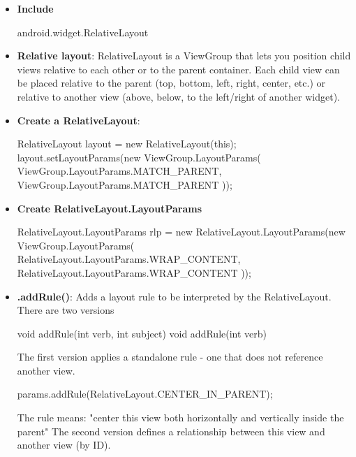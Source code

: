 \documentclass{report}
\begin{document}
    \begin{itemize}
        \item \textbf{Include}
            \bigbreak \noindent 
            \begin{javacode}
                android.widget.RelativeLayout
            \end{javacode}
        \item \textbf{Relative layout}: RelativeLayout is a ViewGroup that lets you position child views relative to each other or to the parent container.
            \bigbreak \noindent 
            Each child view can be placed relative to the parent (top, bottom, left, right, center, etc.) or relative to another view (above, below, to the left/right of another widget).
        \item \textbf{Create a RelativeLayout}:
            \bigbreak \noindent 
            \begin{javacode}
                RelativeLayout layout = new RelativeLayout(this);
                layout.setLayoutParams(new ViewGroup.LayoutParams(
                    ViewGroup.LayoutParams.MATCH_PARENT,
                    ViewGroup.LayoutParams.MATCH_PARENT
                ));
            \end{javacode}
        \item \textbf{Create RelativeLayout.LayoutParams}
            \bigbreak \noindent 
            \begin{javacode}
            RelativeLayout.LayoutParams rlp = new RelativeLayout.LayoutParams(new ViewGroup.LayoutParams(
                RelativeLayout.LayoutParams.WRAP_CONTENT,
                RelativeLayout.LayoutParams.WRAP_CONTENT
            ));
            \end{javacode}
        \item \textbf{.addRule()}: Adds a layout rule to be interpreted by the RelativeLayout. There are two versions
            \bigbreak \noindent 
            \begin{javacode}
                void addRule(int verb, int subject)
                void addRule(int verb)
            \end{javacode}
            \bigbreak \noindent 
            The first version applies a standalone rule - one that does not reference another view.
            \bigbreak \noindent 
            \begin{javacode}
                params.addRule(RelativeLayout.CENTER_IN_PARENT);
            \end{javacode}
            The rule means: "center this view both horizontally and vertically inside the parent"
            \bigbreak \noindent 
            The second version defines a relationship between this view and another view (by ID).


    \end{itemize}
\end{document}
